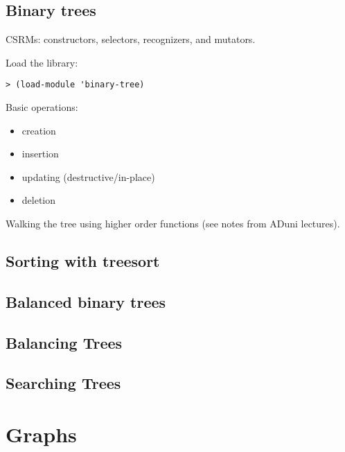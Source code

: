 \documentclass[12pt,openright,draft]{book}
\begin{document}
\section{Binary trees}

CSRMs: constructors, selectors, recognizers, and mutators.

Load the library:

\begin{verbatim}
> (load-module 'binary-tree)
\end{verbatim}

Basic operations:

\begin{itemize}
\item creation
\item insertion
\item updating (destructive/in-place)
\item deletion
\end{itemize}

Walking the tree using higher order functions (see notes from ADuni lectures).

\section{Sorting with treesort}


\section{Balanced binary trees}


\section{Balancing Trees}

\section{Searching Trees}

\chapter{Graphs}
\end{document}
